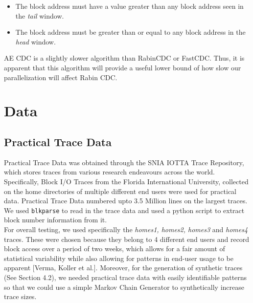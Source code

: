 \documentclass{acmtog} %
\begin{document}
	\begin{itemize}
	\item The block address must have a value greater than any block address seen in the \textit{tail} window.
	\item The block address must be greater than or equal to any block address in the \textit{head} window.
	\end{itemize}
	
	AE CDC is a slightly slower algorithm than RabinCDC or FastCDC. Thus, it is apparent that this algorithm will provide a useful lower bound of how slow our parallelization will affect Rabin CDC.

	\section{Data}
	\subsection{Practical Trace Data}

	Practical Trace Data was obtained through the SNIA IOTTA Trace Repository, which stores traces from various research endeavours across the world. Specifically, Block I/O Traces from the Florida International University, collected on the home directories of multiple different end users were used for practical data. Practical Trace Data numbered upto 3.5 Million lines on the largest traces. We used \texttt{blkparse} to read in the trace data and used a python script to extract block number information from it. \\
	
	For overall testing, we used specifically the \textit{homes1, homes2, homes3} and \textit{homes4} traces. These were chosen because they belong to 4 different end users and record block access over a period of two weeks, which allows for a fair amount of statistical variability while also allowing for patterns in end-user usage to be apparent [Verma, Koller et al.]. Moreover, for the generation of synthetic traces (See Section 4.2), we needed practical trace data with easily identifiable patterns so that we could use a simple Markov Chain Generator to synthetically increase trace sizes.\\
	\\
\end{document}
